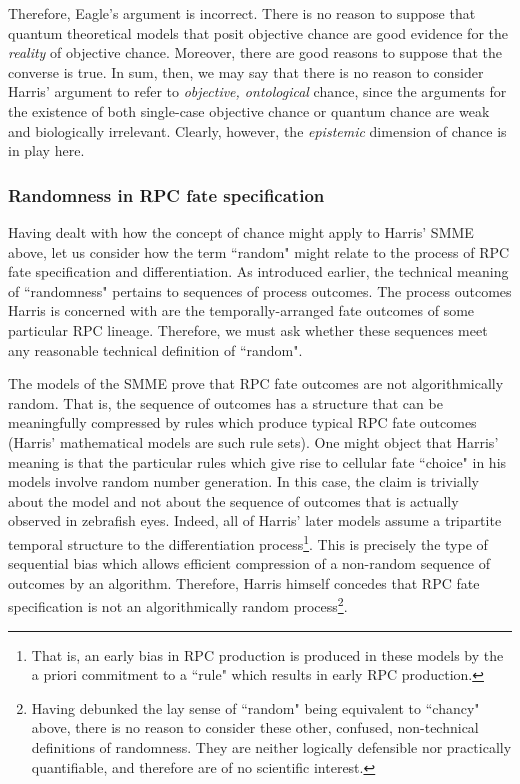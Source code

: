 Therefore, Eagle's argument is incorrect. There is no reason to suppose that quantum theoretical models that posit objective chance are good evidence for the \textit{reality} of objective chance. Moreover, there are good reasons to suppose that the converse is true. In sum, then, we may say that there is no reason to consider Harris' argument to refer to \textit{objective, ontological} chance, since the arguments for the existence of both single-case objective chance or quantum chance are weak and biologically irrelevant. Clearly, however, the \textit{epistemic} dimension of chance is in play here.

\subsubsection{Randomness in RPC fate specification}

Having dealt with how the concept of chance might apply to Harris' SMME above, let us consider how the term ``random" might relate to the process of RPC fate specification and differentiation. As introduced earlier, the technical meaning of ``randomness" pertains to sequences of process outcomes. The process outcomes Harris is concerned with are the temporally-arranged fate outcomes of some particular RPC lineage. Therefore, we must ask whether these sequences meet any reasonable technical definition of ``random".

The models of the SMME prove that RPC fate outcomes are not algorithmically random. That is, the sequence of outcomes has a structure that can be meaningfully compressed by rules which produce typical RPC fate outcomes (Harris' mathematical models are such rule sets). One might object that Harris' meaning is that the particular rules which give rise to cellular fate ``choice" in his models involve random number generation. In this case, the claim is trivially about the model and not about the sequence of outcomes that is actually observed in zebrafish eyes. Indeed, all of Harris' later models assume a tripartite temporal structure to the differentiation process\footnote{That is, an early bias in RPC production is produced in these models by the a priori commitment to a ``rule" which results in early RPC production.}. This is precisely the type of sequential bias which allows efficient compression of a non-random sequence of outcomes by an algorithm. Therefore, Harris himself concedes that RPC fate specification is not an algorithmically random process\footnote{Having debunked the lay sense of ``random" being equivalent to ``chancy" above, there is no reason to consider these other, confused, non-technical definitions of randomness. They are neither logically defensible nor practically quantifiable, and therefore are of no scientific interest.}.

